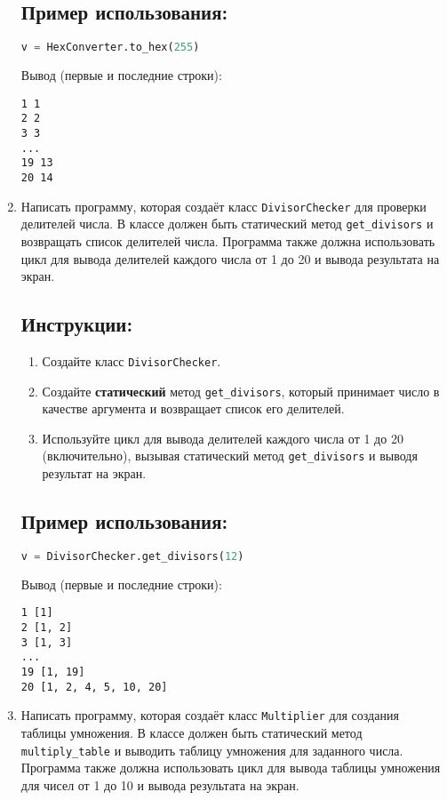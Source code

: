 \begin{enumerate}
\subsection*{Пример использования:}
\begin{lstlisting}[language=Python]
    v = HexConverter.to_hex(255)
\end{lstlisting}
Вывод (первые и последние строки):
\begin{verbatim}
1 1
2 2
3 3
...
19 13
20 14
\end{verbatim}

\item
Написать программу, которая создаёт класс \texttt{DivisorChecker} 
для проверки делителей числа. В классе должен быть статический метод
\texttt{get\_divisors} и возвращать список делителей числа. 
Программа также должна использовать цикл для вывода делителей каждого числа от 
1 до 20 и вывода результата на экран.

\subsection*{Инструкции:}
\begin{enumerate}
    \item Создайте класс \texttt{DivisorChecker}.
    \item Создайте \textbf{статический} метод \texttt{get\_divisors}, который принимает число в качестве аргумента и возвращает список его делителей.
    \item Используйте цикл для вывода делителей каждого числа от 1 до 20 (включительно), вызывая статический метод \texttt{get\_divisors} и выводя результат на экран.
\end{enumerate}

\subsection*{Пример использования:}
\begin{lstlisting}[language=Python]
    v = DivisorChecker.get_divisors(12)
\end{lstlisting}
Вывод (первые и последние строки):
\begin{verbatim}
1 [1]
2 [1, 2]
3 [1, 3]
...
19 [1, 19]
20 [1, 2, 4, 5, 10, 20]
\end{verbatim}

\item
Написать программу, которая создаёт класс \texttt{Multiplier} 
для создания таблицы умножения. В классе должен быть статический метод
\texttt{multiply\_table} и выводить таблицу умножения для заданного числа. 
Программа также должна использовать цикл для вывода таблицы умножения для чисел от 
1 до 10 и вывода результата на экран.


\end{enumerate}
